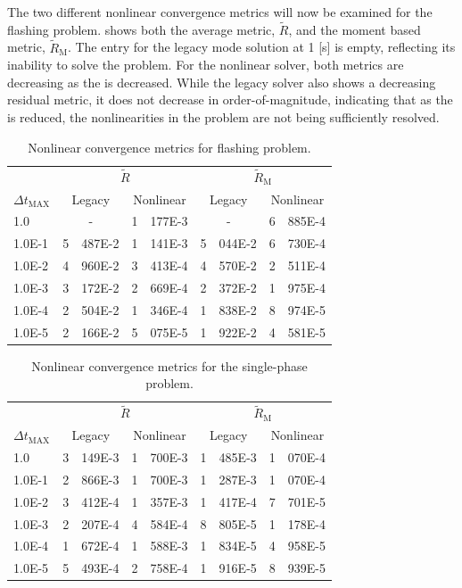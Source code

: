 The two different nonlinear convergence metrics will now be examined for the flashing problem.
 shows both the average metric, $\tilde{R}$, and the moment based metric, $\tilde{R}_{\text{M}}$.
The entry for the legacy mode solution at 1 [s] is empty, reflecting its inability to solve the problem.
For the nonlinear solver, both metrics are decreasing as the \dtmax{} is decreased.
While the legacy solver also shows a decreasing residual metric, it does not decrease in order-of-magnitude, indicating that as the \dtmax{} is reduced, the nonlinearities in the problem are not being sufficiently resolved.

\begin{table}[h!t]
\centering
\begin{tabular}{@{}l r@{.}l r@{.}l r@{.}l r@{.}l @{}}
\toprule
& \multicolumn{4}{c}{$\tilde{R}$} & \multicolumn{4}{c}{$\tilde{R}_{\text{M}}$}  \\
$\Delta t_{\text{MAX}}$ & \multicolumn{2}{c}{Legacy} & \multicolumn{2}{c}{Nonlinear} & \multicolumn{2}{c}{Legacy}& \multicolumn{2}{c}{Nonlinear}  \\
\midrule
1.0    & \multicolumn{2}{c}{-} & 1&177E-3 & \multicolumn{2}{c}{-} & 6&885E-4 \\
1.0E-1 & 5&487E-2 & 1&141E-3 & 5&044E-2 & 6&730E-4 \\
1.0E-2 & 4&960E-2 & 3&413E-4 & 4&570E-2 & 2&511E-4 \\
1.0E-3 & 3&172E-2 & 2&669E-4 & 2&372E-2 & 1&975E-4 \\
1.0E-4 & 2&504E-2 & 1&346E-4 & 1&838E-2 & 8&974E-5 \\
1.0E-5 & 2&166E-2 & 5&075E-5 & 1&922E-2 & 4&581E-5 \\
\bottomrule  
\end{tabular}
\caption{Nonlinear convergence metrics for flashing problem.}
\label{tab:flashing_criteria}
\end{table}

\begin{table}[h!t]
\centering
\begin{tabular}{@{}l r@{.}l r@{.}l r@{.}l r@{.}l @{}}
\toprule
& \multicolumn{4}{c}{$\tilde{R}$} & \multicolumn{4}{c}{$\tilde{R}_{\text{M}}$}  \\
$\Delta t_{\text{MAX}}$ & \multicolumn{2}{c}{Legacy} & \multicolumn{2}{c}{Nonlinear} & \multicolumn{2}{c}{Legacy}& \multicolumn{2}{c}{Nonlinear}  \\
\midrule
1.0    & 3&149E-3 & 1&700E-3 & 1&485E-3 & 1&070E-4 \\
1.0E-1 & 2&866E-3 & 1&700E-3 & 1&287E-3 & 1&070E-4 \\
1.0E-2 & 3&412E-4 & 1&357E-3 & 1&417E-4 & 7&701E-5 \\
1.0E-3 & 2&207E-4 & 4&584E-4 & 8&805E-5 & 1&178E-4 \\
1.0E-4 & 1&672E-4 & 1&588E-3 & 1&834E-5 & 4&958E-5 \\
1.0E-5 & 5&493E-4 & 2&758E-4 & 1&916E-5 & 8&939E-5 \\
\bottomrule  
\end{tabular}
\caption{Nonlinear convergence metrics for the single-phase problem.}
\label{tab:single_criteria}
\end{table}

